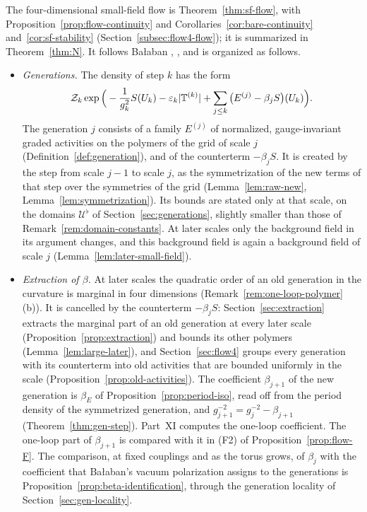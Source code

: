 \begin{remark}\label{rem:flow-status}
The four-dimensional small-field flow is Theorem~\ref{thm:sf-flow}, with Proposition~\ref{prop:flow-continuity} and Corollaries~\ref{cor:bare-continuity} and~\ref{cor:sf-stability} (Section~\ref{subsec:flow4-flow}); it is summarized in Theorem~\ref{thm:N}. It follows Ba\l aban \cite[(0.22)--(0.30), Sects.~1--5]{BalYM4I}, \cite[Sects.~1--2]{BalYM4II}, and is organized as follows.
\begin{itemize}
\item \emph{Generations.} The density of step $k$ has the form
\[
\mathcal Z_k\exp\Big(-\frac1{g_k^2}S(U_k)-\varepsilon_k|\mathbb T^{(k)}|+\sum_{j\le k}\big(E^{(j)}-\beta_jS\big)(U_k)\Big).
\]
The generation $j$ consists of a family $E^{(j)}$ of normalized, gauge-invariant graded activities on the polymers of the grid of scale $j$ (Definition~\ref{def:generation}), and of the counterterm $-\beta_jS$. It is created by the step from scale $j-1$ to scale $j$, as the symmetrization of the new terms of that step over the symmetries of the grid (Lemma~\ref{lem:raw-new}, Lemma~\ref{lem:symmetrization}). Its bounds are stated only at that scale, on the domains $\mathcal U^\flat$ of Section~\ref{sec:generations}, slightly smaller than those of Remark~\ref{rem:domain-constants}. At later scales only the background field in its argument changes, and this background field is again a background field of scale $j$ (Lemma~\ref{lem:later-small-field}).
\item \emph{Extraction of $\beta$.} At later scales the quadratic order of an old generation in the curvature is marginal in four dimensions (Remark~\ref{rem:one-loop-polymer}(b)). It is cancelled by the counterterm $-\beta_jS$: Section~\ref{sec:extraction} extracts the marginal part of an old generation at every later scale (Proposition~\ref{prop:extraction}) and bounds its other polymers (Lemma~\ref{lem:large-later}), and Section~\ref{sec:flow4} groups every generation with its counterterm into old activities that are bounded uniformly in the scale (Proposition~\ref{prop:old-activities}). The coefficient $\beta_{j+1}$ of the new generation is $\beta_E$ of Proposition~\ref{prop:period-iso}, read off from the period density of the symmetrized generation, and $g_{j+1}^{-2}=g_j^{-2}-\beta_{j+1}$ (Theorem~\ref{thm:gen-step}). Part~XI computes the one-loop coefficient. The one-loop part of $\beta_{j+1}$ is compared with it in (F2) of Proposition~\ref{prop:flow-F}. The comparison, at fixed couplings and as the torus grows, of $\beta_j$ with the coefficient that Ba\l aban's vacuum polarization \cite[(1.20)--(1.22)]{BalYM4I} assigns to the generations is Proposition~\ref{prop:beta-identification}, through the generation locality of Section~\ref{sec:gen-locality}.

\end{itemize}
\end{remark}
